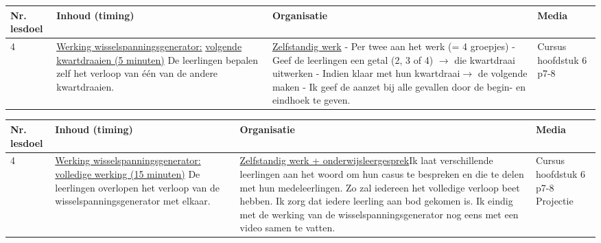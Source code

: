 \begin{landscape}
\begin{tabularx}{1.56\textwidth}{|p{1.5cm}|p{8cm}|X|p{4cm}|}
\hline
\textbf{Nr. lesdoel } & \textbf{Inhoud (timing)}  & \textbf{Organisatie } & \textbf{Media } \\ \hline
4& \underline{Werking wisselspanningsgenerator:} \underline{volgende kwartdraaien (5 minuten)}\newline
De leerlingen bepalen zelf het verloop van één van de andere kwartdraaien. 
&  \underline{Zelfstandig werk}\newline 
 - Per twee aan het werk (= 4 groepjes)\newline
 - Geef de leerlingen een getal (2, 3 of 4) $\rightarrow$ die kwartdraai uitwerken\newline
 - Indien klaar met hun kwartdraai$\rightarrow$ de volgende maken\newline
 - Ik geef de aanzet bij alle gevallen door de begin- en eindhoek te geven.
&  Cursus hoofdstuk 6 p7-8
\\ \hline
\end{tabularx}\vspace{5mm}

\begin{tabularx}{1.56\textwidth}{|p{1.5cm}|p{8cm}|X|p{4cm}|}
	\hline
	\textbf{Nr. lesdoel } & \textbf{Inhoud (timing)}  & \textbf{Organisatie } & \textbf{Media } \\ \hline
	4& \underline{Werking wisselspanningsgenerator:} \underline{volledige werking (15 minuten)}\newline
	De leerlingen overlopen het verloop van de wisselspanningsgenerator met elkaar. 
	&  \underline{Zelfstandig werk + onderwijsleergesprek}\newline  Ik laat verschillende leerlingen aan het woord om hun casus te bespreken en die te delen met hun medeleerlingen. Zo zal iedereen het volledige verloop beet hebben. Ik zorg dat iedere leerling aan bod gekomen is. Ik eindig met de werking van de wisselspanningsgenerator nog eens met een video samen te vatten.
	&  Cursus hoofdstuk 6 p7-8 \newline\newline Projectie
	\\ \hline
\end{tabularx}\vspace{5mm}




\end{landscape}
